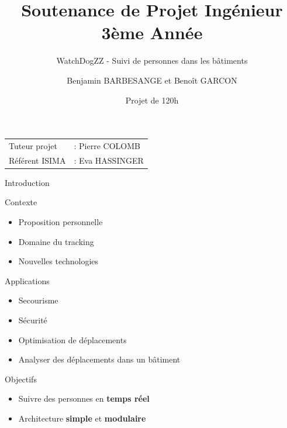 \documentclass{beamer} %
\author{Benjamin BARBESANGE et Benoît GARCON}
\title{Soutenance de Projet Ingénieur 3ème Année}
\subtitle{WatchDogZZ - Suivi de personnes dans les bâtiments}
\date{Projet de 120h}
\begin{document}
	\begin{frame} %
		\maketitle
    \vspace*{1cm}
    \footnotesize
    \begin{tabular}{ll}
      Tuteur projet &: Pierre COLOMB\\
      Référent ISIMA &: Eva HASSINGER
    \end{tabular}
	\end{frame}


  \begin{frame}{Introduction}
    
    \begin{block}{Contexte}
      \begin{itemize}
        \item Proposition personnelle
        \item Domaine du tracking
        \item Nouvelles technologies
      \end{itemize}
    \end{block}

    \pause

    \begin{exampleblock}{Applications}
      \begin{itemize}
        \item Secourisme
        \item Sécurité
        \item Optimisation de déplacements
        \item Analyser des déplacements dans un bâtiment
      \end{itemize}
    \end{exampleblock}

    \pause

    \begin{alertblock}{Objectifs}
      \begin{itemize}
        \item Suivre des personnes en \textbf{temps réel}
        \item Architecture \textbf{simple} et \textbf{modulaire}
      \end{itemize}
    \end{alertblock}

  \end{frame}
\end{document}
